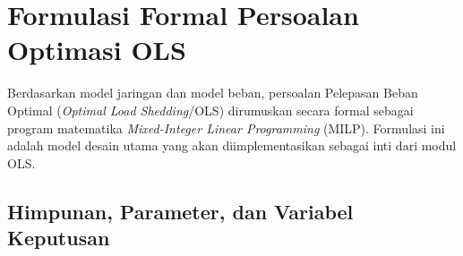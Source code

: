 \section{Formulasi Formal Persoalan Optimasi OLS}
\label{sec:Formulasi_Formal_Persoalan_Optimasi}

Berdasarkan model jaringan dan model beban, persoalan Pelepasan Beban Optimal (\textit{Optimal Load Shedding}/OLS) dirumuskan secara formal sebagai program matematika \textit{Mixed-Integer Linear Programming} (MILP). Formulasi ini adalah model desain utama yang akan diimplementasikan sebagai inti dari modul OLS.

\subsection{Himpunan, Parameter, dan Variabel Keputusan}
\label{subsec:Himpunan_Parameter_Variabel}


